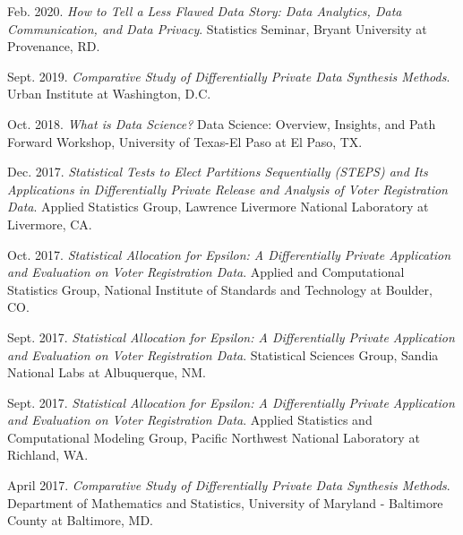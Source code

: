 \documentclass[11pt, letterpaper, roman]{moderncv} %
\begin{document}
\begin{etaremune}[topsep=0pt, itemsep=6pt, partopsep=0pt, parsep=0pt]
    \item Feb. 2020. \textit{How to Tell a Less Flawed Data Story: Data Analytics, Data Communication, and Data Privacy}. Statistics Seminar, Bryant University at Provenance, RD.
    
    \item Sept. 2019. \textit{Comparative Study of Differentially Private Data Synthesis Methods}. Urban Institute at Washington, D.C.
    
    \item Oct. 2018. \textit{What is Data Science?} Data Science: Overview, Insights, and Path Forward Workshop, University of Texas-El Paso at El Paso, TX.
    
    \item Dec. 2017. \textit{Statistical Tests to Elect Partitions Sequentially (STEPS) and Its Applications in Differentially Private Release and Analysis of Voter Registration Data}. Applied Statistics Group, Lawrence Livermore National Laboratory at Livermore, CA.
    
    \item Oct. 2017. \textit{Statistical Allocation for Epsilon: A Differentially Private Application and Evaluation on Voter Registration Data}. Applied and Computational Statistics Group, National Institute of Standards and Technology at Boulder, CO.
    
    \item Sept. 2017. \textit{Statistical Allocation for Epsilon: A Differentially Private Application and Evaluation on Voter Registration Data}. Statistical Sciences Group, Sandia National Labs at Albuquerque, NM.
    
    \item Sept. 2017. \textit{Statistical Allocation for Epsilon: A Differentially Private Application and Evaluation on Voter Registration Data}. Applied Statistics and Computational Modeling Group, Pacific Northwest National Laboratory at Richland, WA.
    
    \item April 2017. \textit{Comparative Study of Differentially Private Data Synthesis Methods}. Department of Mathematics and Statistics, University of Maryland - Baltimore County at Baltimore, MD.
\end{etaremune}

\end{document}
